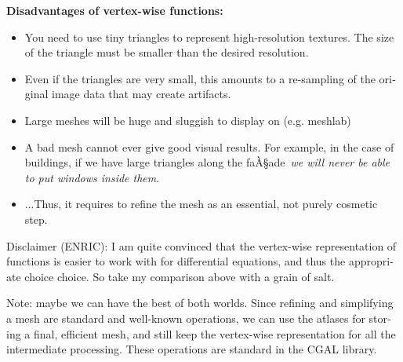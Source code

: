 \documentclass{article}
\def\R{\mathbf{R}} %
\begin{document}
\begin{otherlanguage}{british}
{\bf Disadvantages of vertex-wise functions:}

\begin{itemize}
	\item You need to use tiny triangles to represent high-resolution
		textures.  The size of the triangle must be smaller than the
		desired resolution.
	\item Even if the triangles are very small, this amounts to a
		re-sampling of the original image data that may create
		artifacts.
	\item Large meshes will be huge and sluggish to display on (e.g.
		meshlab)
	\item A bad mesh cannot ever give good visual results.  For example,
		in the case of buildings, if we have large triangles along
		the faÀ§ade~\emph{we will never be able to put windows inside
		them}.
	\item ...Thus, it requires to refine the mesh as an essential, not
		purely cosmetic step.
\end{itemize}

Disclaimer (ENRIC): I am quite convinced that the vertex-wise representation
of functions is easier to work with for differential equations, and thus the
appropriate choice choice.  So take my comparison above with a grain of salt.

Note: maybe we can have the best of both worlds.  Since refining and
simplifying a mesh are standard and well-known operations, we can use the
atlases for storing a final, efficient mesh, and still keep the vertex-wise
representation for all the intermediate processing.  These operations are
standard in the CGAL library.

\end{otherlanguage}



%
%
%
\end{document}
